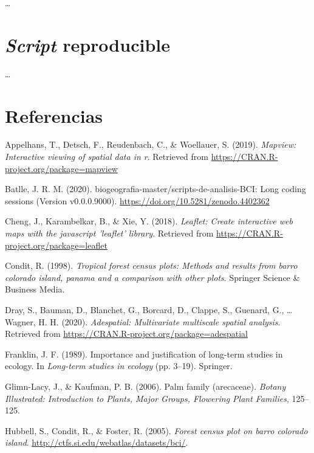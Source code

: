 \documentclass[11pt,]{article}
\begin{document}
\ldots

\section{\texorpdfstring{\emph{Script}
reproducible}{Script reproducible}}\label{script-reproducible}

\ldots

\section*{Referencias}\label{referencias}

\hypertarget{refs}{}
\hypertarget{ref-MapView}{}
Appelhans, T., Detsch, F., Reudenbach, C., \& Woellauer, S. (2019).
\emph{Mapview: Interactive viewing of spatial data in r}. Retrieved from
\url{https://CRAN.R-project.org/package=mapview}

\hypertarget{ref-jose_ramon_martinez_batlle_2020_4402362}{}
Batlle, J. R. M. (2020). biogeografia-master/scripts-de-analisis-BCI:
Long coding sessions (Version v0.0.0.9000).
\url{https://doi.org/10.5281/zenodo.4402362}

\hypertarget{ref-Leaflet}{}
Cheng, J., Karambelkar, B., \& Xie, Y. (2018). \emph{Leaflet: Create
interactive web maps with the javascript 'leaflet' library}. Retrieved
from \url{https://CRAN.R-project.org/package=leaflet}

\hypertarget{ref-condit1998tropical}{}
Condit, R. (1998). \emph{Tropical forest census plots: Methods and
results from barro colorado island, panama and a comparison with other
plots}. Springer Science \& Business Media.

\hypertarget{ref-adespatial}{}
Dray, S., Bauman, D., Blanchet, G., Borcard, D., Clappe, S., Guenard,
G., \ldots{} Wagner, H. H. (2020). \emph{Adespatial: Multivariate
multiscale spatial analysis}. Retrieved from
\url{https://CRAN.R-project.org/package=adespatial}

\hypertarget{ref-franklin1989importance}{}
Franklin, J. F. (1989). Importance and justification of long-term
studies in ecology. In \emph{Long-term studies in ecology} (pp. 3--19).
Springer.

\hypertarget{ref-glimn2006palm}{}
Glimn-Lacy, J., \& Kaufman, P. B. (2006). Palm family (arecaceae).
\emph{Botany Illustrated: Introduction to Plants, Major Groups,
Flowering Plant Families}, 125--125.

\hypertarget{ref-Hubbell2005Barro}{}
Hubbell, S., Condit, R., \& Foster, R. (2005). \emph{Forest census plot
on barro colorado island}.
\url{http://ctfs.si.edu/webatlas/datasets/bci/}.
\end{document}
